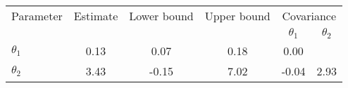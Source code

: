 \begin{tabular}{l|ccc|cc} \hline \hline 
Parameter & Estimate & Lower bound & Upper bound & \multicolumn{2}{c}{Covariance}  \\& & & & $\theta_1$ & $\theta_2$ \\ \hline 
$\theta_1$ & 0.13 & 0.07 & 0.18 & 0.00 & \\ 
$\theta_2$ & 3.43 & -0.15 & 7.02 & -0.04 & 2.93 \\ 
\hline \hline 
\end{tabular} 
